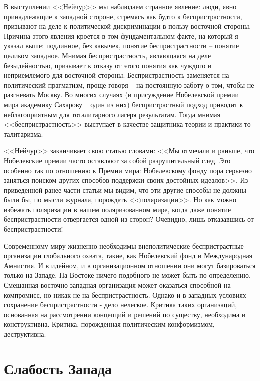 \documentclass{book}
\begin{document}
В выступлении <<Нейчур>> мы наблюдаем странное явление: люди, явно принадлежащие к западной стороне, стремясь как будто к беспристрастности, призывают на деле к политиче­ской дискриминации в пользу восточной стороны. Причина этого явления кроется в том фундаментальном факте, на кото­рый я указал выше: подлинное, без кавычек, понятие бесприст­растности -- понятие целиком западное. Мнимая беспристраст­ность, являющаяся на деле безыдейностью, призывает к отказу от этого понятия как чуждого и неприемлемого для восточной стороны. Беспристрастность заменяется на политический праг­матизм, проще говоря -- на постоянную заботу о том, чтобы не разгневать Москву. Во многих случаях (и присуждение Но­белевской премии мира академику Сахарову ~ один из них) беспристрастный подход приводит к неблагоприятным для тоталитарного лагеря результатам. Тогда мнимая <<беспристраст­ность>> выступает в качестве защитника теории и практики то­талитаризма.

<<Нейчур>> заканчивает свою статью словами: <<Мы отмечали и раньше, что Нобелевские премии часто оставляют за собой разрушительный след. Это особенно так по отношению к Пре­мии мира: Нобелевскому фонду пора серьезно заняться поис­ком других способов поддержки своих достойных идеалов>>. Из приведенной ранее части статьи мы видим, что эти другие способы не должны были бы, по мысли журнала, порождать <<поляризации>>. Но как можно избежать поляризации в нашем поляризованном мире, когда даже понятие беспристрастности отвергается одной из сторон? Очевидно, лишь отказавшись от беспристрастности!

Современному миру жизненно необходимы внеполитические беспристрастные организации глобального охвата, такие, как Нобелевский фонд и Международная Амнистия. И в идей­ном, и в организационном отношении они могут базироваться только на Западе. На Востоке ничего подобного не может быть по определению. Смешанная восточно-западная организация мо­жет оказаться способной на компромисс, но никак не на бес­пристрастность. Однако и в западных условиях сохранение бес­пристрастности - дело нелегкое. Критика таких организаций, основанная на рассмотрении концепций и решений по существу, необходима и конструктивна. Критика, порожденная политическим конформизмом, -- деструктивна.



\section{Слабость Запада}
\end{document}
